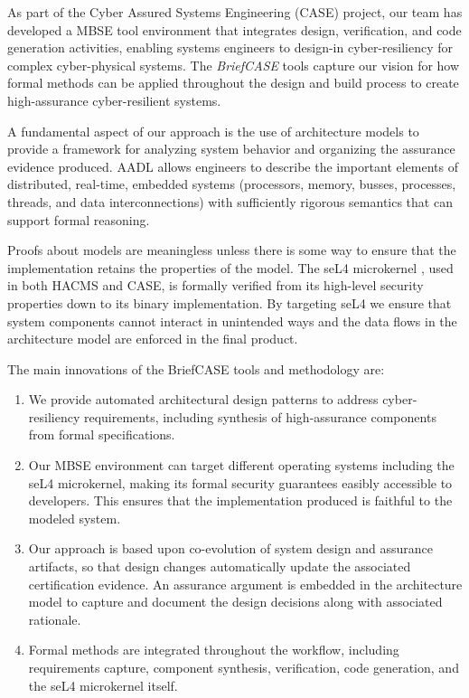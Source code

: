 As part of the Cyber Assured Systems Engineering (CASE) project,
our team has developed a MBSE tool environment that integrates design, verification,
and code generation activities, enabling systems engineers to design-in cyber-resiliency
for complex cyber-physical systems. The {\em BriefCASE} tools capture our 
vision for how formal methods can be applied throughout the design and build process 
to create high-assurance cyber-resilient systems.  

A fundamental aspect of our approach is the use of 
architecture models to provide a framework for analyzing
system behavior and organizing the assurance evidence produced.  
AADL allows engineers to describe the important elements of distributed,
real-time, embedded systems (processors, memory, busses, processes, 
threads, and data interconnections) with sufficiently rigorous semantics
that can support formal reasoning.  

Proofs about models are meaningless unless there is some way to ensure
that the implementation retains the properties of the model.  The seL4 
microkernel \cite{sel4-sosp09}, used in both HACMS and CASE, is
formally verified from its high-level security properties down to its binary implementation.  
By targeting seL4 we ensure that system components cannot interact in unintended 
ways and the data flows in the architecture model are enforced in the
final product.  

The main innovations of the BriefCASE tools and methodology are:

\begin{enumerate}

\item We provide automated architectural design patterns to address cyber-resiliency requirements, 
including synthesis of high-assurance components from formal specifications.

\item Our MBSE environment can target different operating systems including the seL4 microkernel, 
making its formal security guarantees easibly accessible to developers. This ensures that 
the implementation produced is faithful to the modeled system. 

\item Our approach is based upon co-evolution of system design and assurance artifacts, so that
design changes automatically update the associated certification evidence. An assurance argument
is embedded in the architecture model to capture and document the design decisions 
along with associated rationale.

\item Formal methods are integrated throughout the workflow, including requirements capture,
component synthesis, verification, code generation, and the seL4 microkernel itself. 

\end{enumerate}





